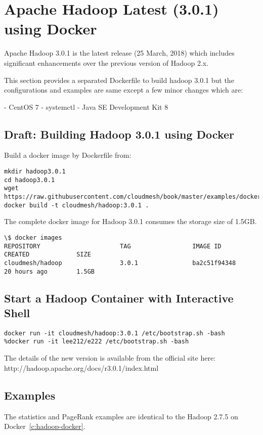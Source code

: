 \label{c:hadoop3-docker}
\chapter{Apache Hadoop Latest (3.0.1) using Docker}

Apache Hadoop 3.0.1 is the latest release (25 March, 2018) which includes significant enhancements over the previous version of Hadoop 2.x.

This section provides a separated Dockerfile to build hadoop 3.0.1 but the configurations and examples are same except a few minor changes which are:

- CentOS 7 
- systemctl
- Java SE Development Kit 8

\section{Draft: Building Hadoop 3.0.1 using Docker}

Build a docker image by Dockerfile from:

\begin{lstlisting}
mkdir hadoop3.0.1
cd hadoop3.0.1
wget https://raw.githubusercontent.com/cloudmesh/book/master/examples/docker/hadoop/3.0.1/Dockerfile
docker build -t cloudmesh/hadoop:3.0.1 .
\end{lstlisting}

The complete docker image for Hadoop 3.0.1 consumes the storage size of 1.5GB.

\begin{lstlisting}
\$ docker images
REPOSITORY                      TAG                 IMAGE ID            CREATED             SIZE
cloudmesh/hadoop                3.0.1               ba2c51f94348        20 hours ago        1.5GB
\end{lstlisting}


\section{Start a Hadoop Container with Interactive Shell}

\begin{lstlisting}
docker run -it cloudmesh/hadoop:3.0.1 /etc/bootstrap.sh -bash
%docker run -it lee212/e222 /etc/bootstrap.sh -bash
\end{lstlisting}

The details of the new version is available from the official site here: http://hadoop.apache.org/docs/r3.0.1/index.html

\section{Examples}

The statistics and PageRank examples are identical to the Hadoop 2.7.5 on Docker~\ref{c:hadoop-docker}. 

